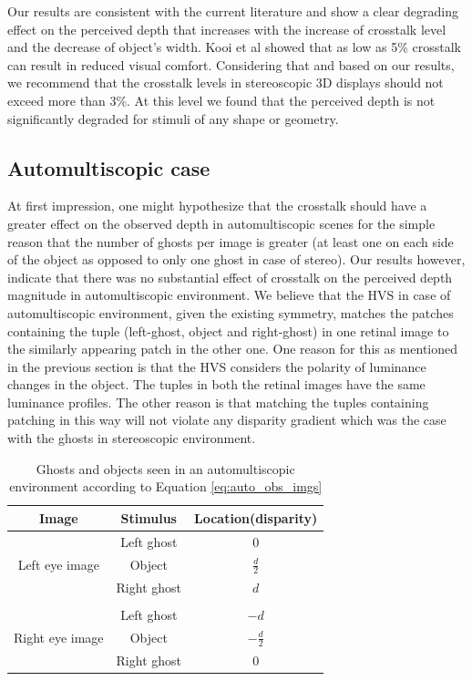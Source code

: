 Our results are consistent with the current literature and show a clear degrading effect on the perceived depth that increases with the increase of crosstalk level and the decrease of object's width. Kooi et al \cite{kooi2004visual} showed that as low as 5\% crosstalk can result in reduced visual comfort. Considering that and based on our results, we recommend that the crosstalk levels in stereoscopic 3D displays should not exceed more than 3\%. At this level we found that the perceived depth is not significantly degraded for stimuli of any shape or geometry. \pagebreak


\subsection{Automultiscopic case}

At first impression, one might hypothesize that the crosstalk should have a greater effect on the observed depth in automultiscopic scenes for the simple reason that the number of ghosts per image is greater (at least one on each side of the object as opposed to only one ghost in case of stereo). Our results however, indicate that there was no substantial effect of crosstalk on the perceived depth magnitude in automultiscopic environment. We believe that the HVS in case of automultiscopic environment, given the existing symmetry, matches the patches containing the tuple (left-ghost, object and right-ghost) in one retinal image to the similarly appearing patch in the other one. One reason for this as mentioned in the previous section is that the HVS considers the polarity of luminance changes in the object. The tuples in both the retinal images have the same luminance profiles. The other reason is that matching the tuples containing patching in this way will not violate any disparity gradient which was the case with the ghosts in stereoscopic environment.

\begin{table}[ht!]
  \begin{center}
    \caption{Ghosts and objects seen in an automultiscopic environment according to Equation \ref{eq:auto_obs_imgs}}
    \label{tab:ghost_obj_names}
    \begin{tabular}{ccc}
      \toprule
      Image & Stimulus  & Location(disparity)\\
      \midrule
                       & Left ghost & 0  \\
      Left eye image   & Object & $\frac{d}{2}$\\
                       & Right ghost & $d$\\
                       &             & \\
                       & Left ghost & $-d$  \\
      Right eye image  & Object & $-\frac{d}{2}$\\
                       & Right ghost & 0\\
      \bottomrule
    \end{tabular}
  \end{center}
\end{table}

